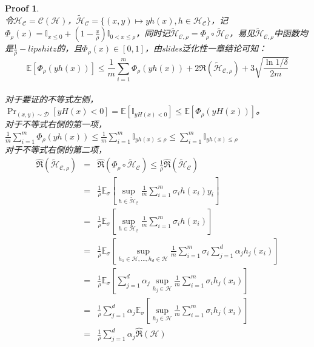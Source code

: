 \documentclass[a4paper,UTF8]{article}
\numberwithin{equation}{section}
\newtheorem*{myProof}{Proof}
\begin{document}
\begin{myProof}
~\\
令$\mathcal{H}_\mathcal{C} = \mathcal{C}(\mathcal{H})$，$\tilde{\mathcal{H}}_\mathcal{C} = \{ (x, y) \mapsto yh(x), h \in \mathcal{H}_\mathcal{C} \}$，记$\Phi_\rho(x) = \mathbb{I}_{x \le 0} + (1 - \frac{x}{\rho})\mathbb{I}_{0 < x \le \rho}$，同时记$\tilde{\mathcal{H}}_{\mathcal{C},\rho} = \Phi_\rho \circ \tilde{\mathcal{H}}_\mathcal{C}$，易见$\tilde{\mathcal{H}}_{\mathcal{C},\rho}$中函数均是$\frac{1}{\rho}-lipshitz$的，且$\Phi_\rho(x) \in [0, 1]$，由slides泛化性一章结论可知：
\begin{equation*}
\mathbb{E}[\Phi_\rho(yh(x))] \le \frac{1}{m}\sum_{i=1}^m \Phi_\rho(yh(x)) + 2 \hat{\mathfrak{R}}(\tilde{\mathcal{H}}_{\mathcal{C},\rho}) + 3 \sqrt{\frac{\ln 1 / \delta}{2m}}
\end{equation*} ~\\
对于要证的不等式左侧，$\Pr_{(x,y)\sim \mathcal{D}}[yH(x)<0] = \mathbb{E}[\mathbb{I}_{yH(x) < 0}] \le \mathbb{E}[ \Phi_\rho(yH(x)) ]$。~\\
对于不等式右侧的第一项，$\frac{1}{m}\sum_{i=1}^m \Phi_\rho(yh(x)) \le \frac{1}{m}\sum_{i=1}^m \mathbb{I}_{yh(x) \le \rho} \le \sum_{i=1}^m \mathbb{I}_{yh(x) \le \rho}$~\\
对于不等式右侧的第二项，
\begin{eqnarray*}
\hat{\mathfrak{R}}(\tilde{\mathcal{H}}_{\mathcal{C},\rho}) &=& \hat{\mathfrak{R}}(\Phi_\rho \circ \tilde{\mathcal{H}}_\mathcal{C}) \le \frac{1}{\rho} \hat{\mathfrak{R}}(\tilde{\mathcal{H}}_\mathcal{C}) \\
&=& \frac{1}{\rho} \mathbb{E}_\sigma [ \sup_{h \in \tilde{\mathcal{H}}_\mathcal{C}} \frac{1}{m} \sum_{i=1}^m \sigma_i h(x_i)y_i ] \\
&=& \frac{1}{\rho} \mathbb{E}_\sigma [ \sup_{h \in \mathcal{H}_\mathcal{C}} \frac{1}{m} \sum_{i=1}^m \sigma_i h(x_i) ] \\
&=& \frac{1}{\rho} \mathbb{E}_\sigma [ \sup_{h_1 \in \mathcal{H}, \ldots, h_d \in \mathcal{H}} \frac{1}{m} \sum_{i=1}^m \sigma_i \sum_{j=1}^d \alpha_j h_j(x_i) ] \\
&=& \frac{1}{\rho} \mathbb{E}_\sigma [ \sum_{j=1}^d \alpha_j \sup_{h_j \in \mathcal{H}} \frac{1}{m} \sum_{i=1}^m \sigma_i h_j(x_i) ] \\
&=& \frac{1}{\rho} \sum_{j=1}^d \alpha_j  \mathbb{E}_\sigma [ \sup_{h_j \in \mathcal{H}} \frac{1}{m} \sum_{i=1}^m \sigma_i h_j(x_i) ] \\
&=& \frac{1}{\rho} \sum_{j=1}^d \alpha_j  \hat{\mathfrak{R}}(\mathcal{H}) \\

\end{eqnarray*}
\end{myProof}
\end{document}

